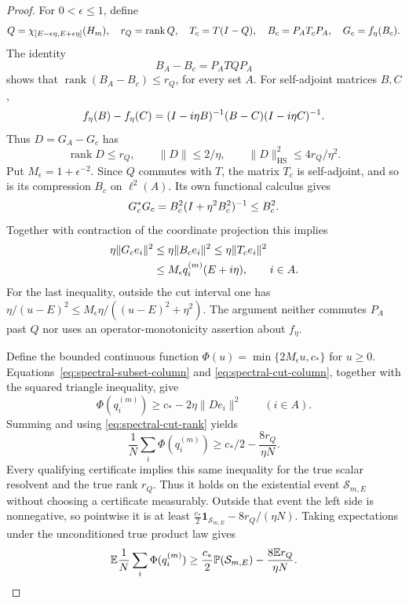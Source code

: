 \begin{proof}
For $0<\epsilon\le1$, define
\[
 Q=\chi_{[E-\epsilon\eta,E+\epsilon\eta]}(H_m),\quad
 r_Q=\operatorname{rank}Q,\quad
 T_c=T(I-Q),\quad B_c=P_AT_cP_A,\quad G_c=f_\eta(B_c).
\]
The identity
\[
 B_A-B_c=P_ATQ P_A
\]
shows that $\operatorname{rank}(B_A-B_c)\le r_Q$, for every set $A$.
For self-adjoint matrices $B,C$,
\[
 f_\eta(B)-f_\eta(C)
 =(I-i\eta B)^{-1}(B-C)(I-i\eta C)^{-1}.
\]
Thus $D=G_A-G_c$ has
\begin{equation}\label{eq:spectral-cut-rank}
 \operatorname{rank}D\le r_Q,\qquad
 \|D\|\le2/\eta,\qquad
 \|D\|_{\mathrm{HS}}^2\le4r_Q/\eta^2.
\end{equation}
Put $M_\epsilon=1+\epsilon^{-2}$.
Since $Q$ commutes with $T$, the matrix $T_c$ is self-adjoint,
and so is its compression $B_c$ on $\ell^2(A)$. Its own
functional calculus gives
\[
 G_c^*G_c=B_c^2(I+\eta^2B_c^2)^{-1}\le B_c^2.
\]
Together with contraction of the coordinate projection this implies
\begin{align}
 \eta\|G_ce_i\|^2
 &\le\eta\|B_ce_i\|^2\le\eta\|T_ce_i\|^2\notag\\
 &\le M_\epsilon q_i^{(m)}(E+i\eta),\qquad i\in A.
 \label{eq:spectral-cut-column}
\end{align}
For the last inequality, outside the cut interval one has
$\eta/(u-E)^2\le M_\epsilon\eta/((u-E)^2+\eta^2)$.
The argument neither commutes $P_A$ past $Q$ nor uses an
operator-monotonicity assertion about $f_\eta$.

Define the bounded continuous function
$\Phi(u)=\min\{2M_\epsilon u,c_*\}$ for $u\ge0$.
Equations~\eqref{eq:spectral-subset-column} and
\eqref{eq:spectral-cut-column}, together with the squared triangle
inequality, give
\[
 \Phi(q_i^{(m)})\ge c_*-2\eta\|De_i\|^2\qquad(i\in A).
\]
Summing and using \eqref{eq:spectral-cut-rank} yields
\[
 \frac1N\sum_i\Phi(q_i^{(m)})
 \ge c_*/2-\frac{8r_Q}{\eta N}.
\]
Every qualifying certificate implies this same inequality for the
true scalar resolvent and the true rank $r_Q$. Thus it holds on
the existential event $\mathcal S_{m,E}$ without choosing a
certificate measurably. Outside that event the left side is
nonnegative, so pointwise it is at least
$\frac{c_*}{2}\mathbf1_{\mathcal S_{m,E}}-8r_Q/(\eta N)$.
Taking expectations under the unconditioned true product law gives
\begin{equation}\label{eq:spectral-truncated-average}
 \mathbb E\frac1N\sum_i\Phi(q_i^{(m)})
 \ge\frac{c_*}{2}\mathbb P(\mathcal S_{m,E})
       -\frac{8\mathbb E r_Q}{\eta N}.
\end{equation}


\end{proof}
